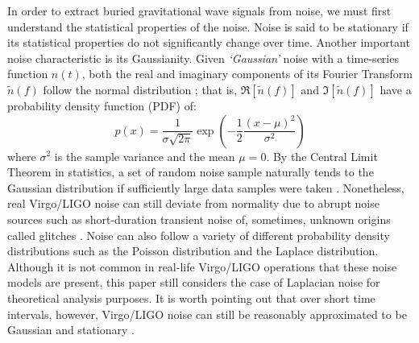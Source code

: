 \documentclass[preprint,
letterpaper,
 amsmath,amssymb,
 aps,
]{revtex4-2}
\begin{document}
In order to extract buried gravitational wave signals from noise, we must first understand the statistical properties of the noise. Noise is said to be stationary if its statistical properties do not significantly change over time. Another important noise characteristic is its Gaussianity. Given \textit{`Gaussian'} noise with a time-series function $n(t)$, both the real and imaginary components of its Fourier Transform $\widetilde{n}(f)$ follow the normal distribution \cite{yamamoto}; that is, $\Re[\widetilde{n}(f)]$ and  $\Im{[\widetilde{n}(f)]}$ have a probability density function (PDF) of:
\begin{equation}
    p(x) = \frac{1}{\sigma\sqrt{2\pi}}\exp{\left(-\frac{1}{2}\frac{(x-\mu)^2}{\sigma^2}\right)}
\end{equation}
where $\sigma^2$ is the sample variance and the mean $\mu = 0$. By the Central Limit Theorem in statistics, a set of random noise sample naturally tends to the Gaussian distribution if sufficiently large data samples were taken \cite{jaranowski2007gravitationalwave}. Nonetheless, real Virgo/LIGO noise can still deviate from normality due to abrupt noise sources such as short-duration transient noise of, sometimes, unknown origins called glitches \cite{ultimate}. Noise can also follow a variety of different probability density distributions such as the Poisson distribution and the Laplace distribution. Although it is not common in real-life Virgo/LIGO operations that these noise models are present, this paper still considers the case of Laplacian noise for theoretical analysis purposes. It is worth pointing out that over short time intervals, however, Virgo/LIGO noise can still be reasonably approximated to be Gaussian and stationary \cite{collaboration2019open}.
\end{document}
